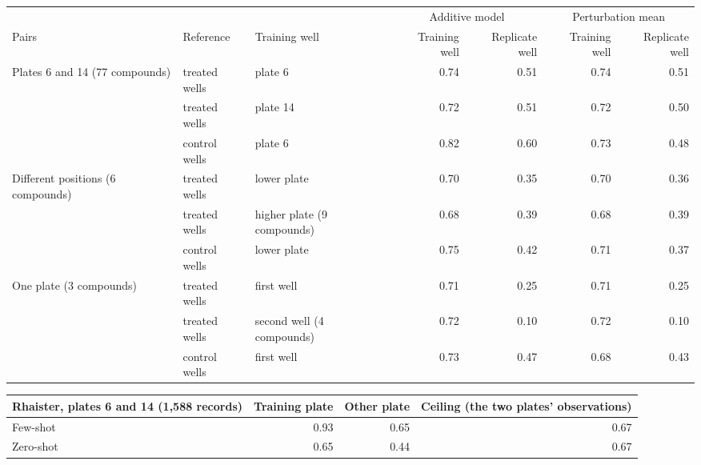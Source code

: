 \begin{table}[!htbp]
{\begin{minipage}{183mm}
\begin{tabular}{@{}lllrrrr@{}}\toprule
 & & & \multicolumn{2}{c}{Additive model} & \multicolumn{2}{c}{Perturbation mean} \\ \cmidrule(lr){4-5}\cmidrule(lr){6-7}
Pairs & Reference & Training well & Training well & Replicate well & Training well & Replicate well \\
\midrule
Plates 6 and 14 (77 compounds) & treated wells & plate 6 & 0.74 & 0.51 & 0.74 & 0.51 \\
 & treated wells & plate 14 & 0.72 & 0.51 & 0.72 & 0.50 \\
 & control wells & plate 6 & 0.82 & 0.60 & 0.73 & 0.48 \\
Different positions (6 compounds) & treated wells & lower plate & 0.70 & 0.35 & 0.70 & 0.36 \\
 & treated wells & higher plate (9 compounds) & 0.68 & 0.39 & 0.68 & 0.39 \\
 & control wells & lower plate & 0.75 & 0.42 & 0.71 & 0.37 \\
One plate (3 compounds) & treated wells & first well & 0.71 & 0.25 & 0.71 & 0.25 \\
 & treated wells & second well (4 compounds) & 0.72 & 0.10 & 0.72 & 0.10 \\
 & control wells & first well & 0.73 & 0.47 & 0.68 & 0.43 \\
\bottomrule\end{tabular}

\vspace{3mm}
\begin{tabular}{@{}lrrr@{}}\toprule
Rhaister, plates 6 and 14 (1,588 records) & Training plate & Other plate & Ceiling (the two plates' observations) \\
\midrule
Few-shot & 0.93 & 0.65 & 0.67 \\
Zero-shot & 0.65 & 0.44 & 0.67 \\
\bottomrule\end{tabular}


\end{minipage}}
\end{table}
